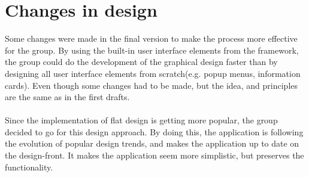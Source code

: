 \section{Changes in design}
Some changes were made in the final version to make the process more effective for the group. By using the built-in user interface elements from the framework, the group could do the development of the graphical design faster than by designing all user interface elements from scratch(e.g. popup menus, information cards). Even though some changes had to be made, but the idea, and principles are the same as in the first drafts.
\\\\
Since the implementation of flat design is getting more popular, the group decided to go for this design approach. By doing this, the application is following the evolution of popular design trends, and makes the application up to date on the design-front. It makes the application seem more simplistic, but preserves the functionality.



